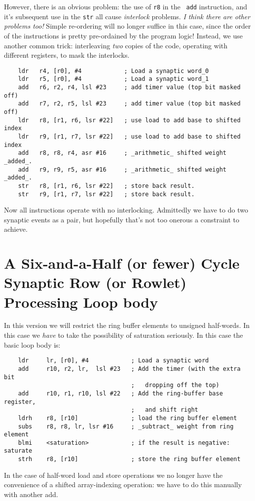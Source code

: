 However, there is an obvious problem: the use of {\tt r8} in the {\tt
  add} instruction, and it's subsequent use in the {\tt str} all cause
{\em interlock} problems. {\em I think there are other problems too!}
Simple re-ordering will no longer suffice in this case, since the
order of the instructions is pretty pre-ordained by the program logic!
Instead, we use another common trick: interleaving {\em two} copies of
the code, operating with different registers, to mask the interlocks.
\begin{verbatim}
    ldr   r4, [r0], #4            ; Load a synaptic word_0
    ldr   r5, [r0], #4            ; Load a synaptic word_1
    add   r6, r2, r4, lsl #23     ; add timer value (top bit masked off)
    add   r7, r2, r5, lsl #23     ; add timer value (top bit masked off) 
    ldr   r8, [r1, r6, lsr #22]   ; use load to add base to shifted index 
    ldr   r9, [r1, r7, lsr #22]   ; use load to add base to shifted index
    add   r8, r8, r4, asr #16     ; _arithmetic_ shifted weight _added_. 
    add   r9, r9, r5, asr #16     ; _arithmetic_ shifted weight _added_. 
    str   r8, [r1, r6, lsr #22]   ; store back result. 
    str   r9, [r1, r7, lsr #22]   ; store back result.
\end{verbatim}
Now all instructions operate with no interlocking. Admittedly we have
to do two synaptic events as a pair, but hopefully that's not too
onerous a constraint to achieve.

\section{A Six-and-a-Half (or fewer) Cycle Synaptic Row (or Rowlet) Processing
  Loop body}

In this version we will restrict the ring buffer elements to unsigned
half-words. In this case we {\em have} to take the possibility of
saturation seriously. In this case the basic loop body is:
\begin{verbatim}
    ldr     lr, [r0], #4            ; Load a synaptic word
    add     r10, r2, lr,  lsl #23   ; Add the timer (with the extra bit
                                    ;   dropping off the top)
    add     r10, r1, r10, lsl #22   ; Add the ring-buffer base register,
                                    ;   and shift right
    ldrh    r8, [r10]               ; load the ring buffer element
    subs    r8, r8, lr, lsr #16     ; _subtract_ weight from ring element
    blmi    <saturation>            ; if the result is negative: saturate
    strh    r8, [r10]               ; store the ring buffer element
\end{verbatim}
In the case of half-word load and store operations we no longer have
the convenience of a shifted array-indexing operation: we have to do
this manually with another add.

